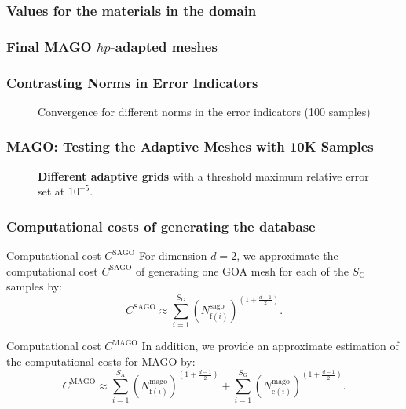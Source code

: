 \begin{frame}
  \frametitle{Values for the materials in the domain}

  \begin{figure}
    \centering	
      
  \end{figure}

\end{frame}

\begin{frame}
	\frametitle{Final MAGO $hp$-adapted meshes}
\end{frame}

\begin{frame}
	\frametitle{Contrasting Norms in Error Indicators}
	\begin{figure}
		\centering
		
		\caption{Convergence for different norms in the error indicators (100 samples)}
	\end{figure}
\end{frame}

\begin{frame}
	\frametitle{MAGO: Testing the Adaptive Meshes with 10K Samples}
	\begin{figure}
 	{\caption{\textbf{Different adaptive grids} with a threshold maximum relative error set at $10^{-5}$.}
	\label{fig:boxplothelm}}
\end{figure}
\end{frame}

\begin{frame}
  \frametitle{Computational costs of generating the database}

 \begin{block}{Computational cost \( C^{\text{SAGO}} \)}
    For dimension \( d = 2 \), we approximate the computational cost \( C^{\text{SAGO}} \) of generating one GOA mesh for each of the \( S_{\text{G}} \) samples by: 
    \begin{equation}
        C^{\text{SAGO}} \approx \sum_{i=1}^{S_{\text{G}}} \left( N_{\text{f}(i)}^{\text{sago}} \right)^{\left( 1+\frac{d-1}{2} \right)}.
        \label{eq:cost_sago}
    \end{equation}
\end{block}
  
  \begin{block}{Computational cost \( C^{\text{MAGO}} \)}
    In addition, we provide an approximate estimation of the computational costs for MAGO by:
    \begin{equation}
      C^{\text{MAGO}} \approx \sum_{i=1}^{S_{\text{A}}} \left( N_{\text{f}(i)}^{\text{mago}} \right)^{\left( 1+\frac{d-1}{2} \right)} + \sum_{i=1}^{S_{\text{G}}} \left( N_{\text{c}(i)}^{\text{mago}} \right)^{\left( 1+\frac{d-1}{2} \right)}.
      \label{eq:cost_mago}
    \end{equation}
  \end{block}
\end{frame}

